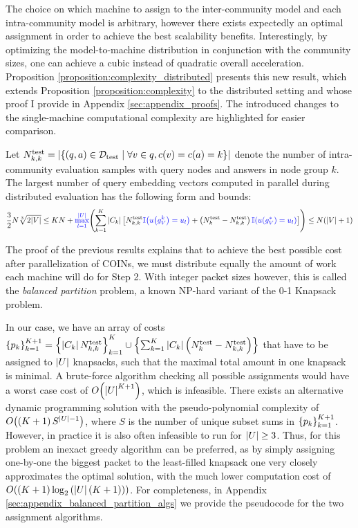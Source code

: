 The choice on which machine to assign to the inter-community model and each intra-community model is arbitrary, however there exists expectedly an optimal assignment in order to achieve the best scalability benefits. Interestingly, by optimizing the model-to-machine distribution in conjunction with the community sizes, one can achieve a cubic instead of quadratic overall acceleration. Proposition \ref{proposition:complexity_distributed} presents this new result, which extends Proposition \ref{proposition:complexity} to the distributed setting and whose proof I provide in Appendix \ref{sec:appendix_proofs}. The introduced changes to the single-machine computational complexity are highlighted for easier comparison.

\begin{proposition}
\label{proposition:complexity_distributed}
    Let $N_{k,k}^{\text{test}}=\mathopen{}\left|\mathopen{}\left\{\mathopen{}\left(q, a\right) \in \mathcal{D}_{\text{test}} \mid \forall v \in q, c\mathopen{}\left(v\right)=c\mathopen{}\left(a\right)=k\right\}\right|$ denote the number of intra-community evaluation samples with query nodes and answers in node group $k$. The largest number of query embedding vectors computed in parallel during distributed evaluation has the following form and bounds:
\begin{equation}
\label{eq:complexity_and_bounds_distributed}
\frac{3}{2} N \sqrt[3]{2\mathopen{}\left|V\right|} \leq KN+\textcolor{blue}{\max_{l=1}^{\mathopen{}\left|U\right|}}{\mathopen{}\left(\sum_{k=1}^{K}{\mathopen{}\left|C_k\right|\mathopen{}\left[N_{k,k}^{\text{test}}\textcolor{blue}{\mathbb{I}\mathopen{}\left(u\mathopen{}\left(g_V^k\right)=u_l\right)} + \mathopen{}\left(N_k^{\text{test}}-N_{k,k}^{\text{test}}\right)\textcolor{blue}{\mathbb{I}\mathopen{}\left(u\mathopen{}\left(g_V^*\right)=u_l\right)}\right]}\right)} \leq N \mathopen{}\left(\mathopen{}\left|V\right| + 1\right) 
\end{equation}
\end{proposition}

The proof of the previous results explains that to achieve the best possible cost after parallelization of COINs, we must distribute equally the amount of work each machine will do for Step 2. With integer packet sizes however, this is called the \emph{balanced partition} problem, a known NP-hard variant of the 0-1 Knapsack problem. 

In our case, we have an array of costs $\mathopen{}\left\{p_k\right\}_{k=1}^{K+1}=\mathopen{}\left\{\mathopen{}\left|C_k\right|N_{k,k}^{\text{test}}\right\}_{k=1}^{K}\cup\mathopen{}\left\{\sum_{k=1}^{K}{\mathopen{}\left|C_k\right|\mathopen{}\left(N_{k}^{\text{test}}-N_{k,k}^{\text{test}}\right)}\right\}$ that have to be assigned to $\mathopen{}\left|U\right|$ knapsacks, such that the maximal total amount in one knapsack is minimal. A brute-force algorithm checking all possible assignments would have a worst case cost of $O\mathopen{}\left(\mathopen{}\left|U\right|^{K+1}\right)$, which is infeasible. There exists an alternative dynamic programming solution with the pseudo-polynomial complexity of $O\mathopen{}\left(\mathopen{}\left(K+1\right)S^{\mathopen{}\left|U\right|-1}\right)$, where $S$ is the number of unique subset sums in $\mathopen{}\left\{p_k\right\}_{k=1}^{K+1}$. However, in practice it is also often infeasible to run for $\mathopen{}\left|U\right|\geq 3$. Thus, for this problem an inexact greedy algorithm can be preferred, as by simply assigning one-by-one the biggest packet to the least-filled knapsack one very closely approximates the optimal solution, with the much lower computation cost of $O\mathopen{}\left(\mathopen{}\left(K+1\right)\log_2{\mathopen{}\left(\mathopen{}\left|U\right|\mathopen{}\left(K+1\right)\right)}\right)$. For completeness, in Appendix \ref{sec:appendix_balanced_partition_algs} we provide the pseudocode for the two assignment algorithms.

